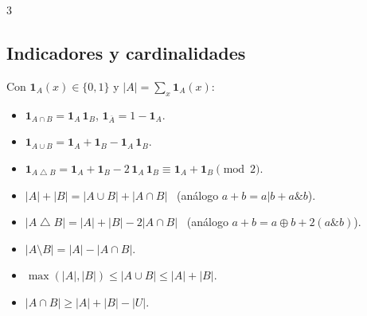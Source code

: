 \documentclass[8pt, spanish, mexico, letterpaper]{extarticle}
\newcommand{\<}{<}
\newcommand{\ov}[1]{\overline{#1}}
\newcommand{\sd}{\mathbin{\triangle}}
\newcommand{\ind}[1]{\mathbf{1}_{#1}}
\newcommand{\card}[1]{\left|#1\right|}
\newcommand{\bor}{\texttt{|}}
\newcommand{\band}{\texttt{\&}}
\begin{document}
\begin{multicols*}{3}
\subsection{Indicadores y cardinalidades}
Con $\ind{A}(x)\in\{0,1\}$ y $\card A=\sum_x\ind A(x)$:
\begin{itemize}
  \item $\ind{A\cap B}=\ind A\,\ind B$, \quad $\ind{\ov A}=1-\ind A$.
  \item $\ind{A\cup B}=\ind A+\ind B-\ind A\,\ind B$.
  \item $\ind{A\sd B}=\ind A+\ind B-2\,\ind A\,\ind B\equiv\ind A+\ind B\pmod 2$.
  \item $\card A+\card B=\card{A\cup B}+\card{A\cap B}$ \ (an\'alogo $a+b=a\bor b+a\band b$).
  \item $\card{A\sd B}=\card A+\card B-2\card{A\cap B}$ \  (an\'alogo  $a+b=a\oplus b+2(a\band b)$).
  \item $\card{A\setminus B}=\card A-\card{A\cap B}$.
  \item $\max(\card A,\card B)\le\card{A\cup B}\le\card A+\card B$.
  \item $\card{A\cap B}\ge\card A+\card B-\card U$.
\end{itemize}
 

\end{multicols*}
\end{document}

